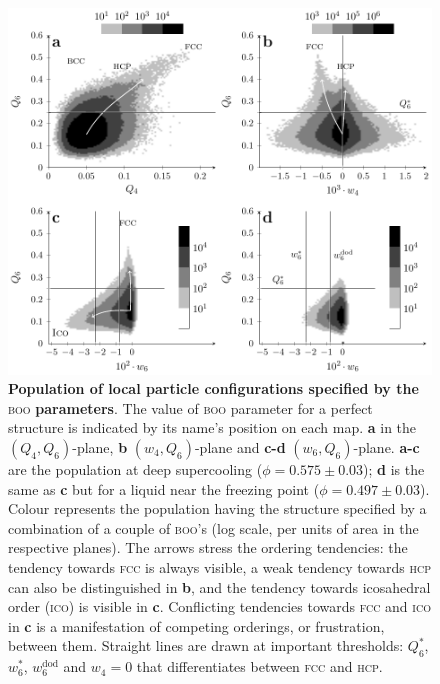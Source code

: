 \begin{figure}
\begin{center}
\includegraphics{generate_figures-figure1.pdf}
\end{center}
\caption{\textbf{Population of local particle configurations specified by the }\textsc{boo}\textbf{ parameters}. The value of \textsc{boo} parameter for a perfect structure is  indicated by its name's position on each map. \textbf{a} in the $(Q_4,Q_6)$-plane, \textbf{b} $(w_4,Q_6)$-plane and \textbf{c-d} $(w_6,Q_6)$-plane. \textbf{a-c} are the population at deep supercooling ($\phi=0.575\pm 0.03$); \textbf{d} is the same as \textbf{c} but for a liquid near the freezing point ($\phi = 0.497 \pm 0.03$). Colour represents the population having the structure  specified by a combination of a couple of \textsc{boo}'s (log scale, per units of area in the respective planes). The arrows stress the ordering tendencies: the tendency towards \textsc{fcc} is always visible, a weak tendency towards \textsc{hcp} can also be distinguished in \textbf{b}, and the tendency towards icosahedral order (\textsc{ico}) is visible in \textbf{c}. 
Conflicting tendencies towards \textsc{fcc} and \textsc{ico} in \textbf{c} is a manifestation of competing orderings, or frustration, between them. Straight lines are drawn at important thresholds: $Q_6^*$, $w_6^*$, $w_6^\text{dod}$ and $w_4=0$ that differentiates between \textsc{fcc} and \textsc{hcp}.}
	\label{fig:maps}
\end{figure}

